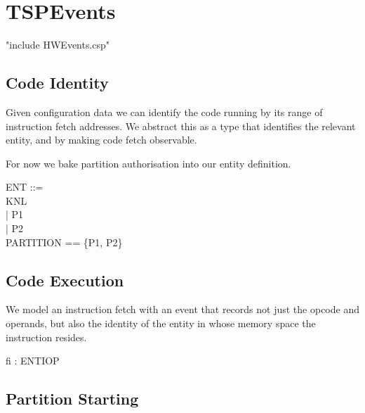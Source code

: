 %
%
%
\section{TSPEvents}

\begin{assert}
"include HWEvents.csp"
\end{assert}

\subsection{Code Identity}%

Given configuration data we can identify the code running
by its range of instruction fetch addresses.
We abstract this as a type that identifies the relevant entity,
and by making code fetch observable.

For now we bake partition authorisation into our entity definition.

\begin{circus}
ENT ::=\\
  KNL\\  %
 | P1\\   %
 | P2\\   %
PARTITION == \{P1, P2\}
\end{circus}

\subsection{Code Execution} %

We model an instruction fetch with an event that records not just the opcode
and operands, but also the identity of the entity in whose memory space the
instruction resides.

\begin{circus}

\circchannel fi : ENT\cross I\cross OP
\end{circus}

\subsection{Partition Starting} %

